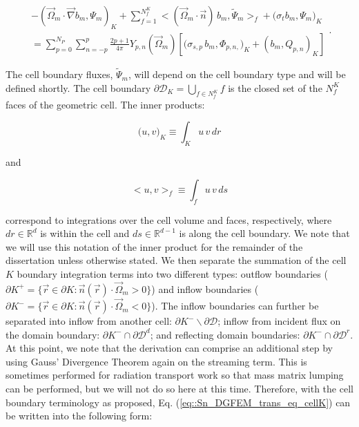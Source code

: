 \begin{equation}
\label{eq::Sn_DGFEM_trans_eq_cellK}
\begin{aligned}
- \left( \vec{\Omega}_m \cdot  \vec{\nabla} b_m, \Psi_{m} \right)_{K} + \sum_{f=1}^{N_f^K} \Big< ( \vec{\Omega}_m \cdot \vec{n} ) \, b_m, \tilde{\Psi}_m  \Big>_{f}  + \Big(  \sigma_{t} b_m ,   \Psi_{m} \Big)_{K} \\
= \sum_{p=0}^{N_P} \sum_{n=-p}^{p} \frac{2p + 1}{4 \pi}  Y_{p,n} (  \vec{\Omega}_m ) \left[ \Big( \sigma_{s,p} \, b_m,  \Phi_{p,n,} \Big)_{K}  + \left(  b_m ,   Q_{p,n} \right)_{K} \right]
\end{aligned} .
\end{equation}

\noindent The cell boundary fluxes, $\tilde{\Psi}_m$, will depend on the cell boundary type and will be defined shortly. The cell boundary $\partial \mathcal{D}_K = \bigcup_{ f \in N_f^K} f$ is the closed set of the $N_f^K$ faces of the geometric cell. The inner products:

\begin{equation}
\label{eq::Sn_spatial_inner_products_cell}
 \Big( u, v \Big)_K \equiv \int_K u \, v \, d r
\end{equation} 

\noindent and

\begin{equation}
\label{eq::Sn_spatial_inner_products_face}
 \Big< u, v \Big>_f \equiv \int_f u \, v \, d s
\end{equation}

\noindent correspond to integrations over the cell volume and faces, respectively, where $dr \in \mathbb{R}^d$ is within the cell and $ds \in \mathbb{R}^{d-1}$ is along the cell boundary. We note that we will use this notation of the inner product for the remainder of the dissertation unless otherwise stated. We then separate the summation of the cell $K$ boundary integration terms into two different types: outflow boundaries ($\partial K^+ = \{  \vec{r} \in \partial K: \vec{n} (\vec{r}) \cdot \vec{\Omega}_m > 0 \}$) and inflow boundaries ($\partial K^- = \{  \vec{r} \in \partial K: \vec{n} (\vec{r}) \cdot \vec{\Omega}_m < 0 \}$). The inflow boundaries can further be separated into inflow from another cell: $\partial K^- \backslash \partial \mathcal{D} $; inflow from incident flux on the domain boundary: $\partial K^- \cap \partial \mathcal{D}^d $; and reflecting domain boundaries: $\partial K^- \cap \partial \mathcal{D}^r $. At this point, we note that the derivation can comprise an additional step by using Gauss' Divergence Theorem again on the streaming term. This is sometimes performed for radiation transport work so that mass matrix lumping can be performed, but we will not do so here at this time. Therefore, with the cell boundary terminology as proposed, Eq. (\ref{eq::Sn_DGFEM_trans_eq_cellK}) can be written into the following form:

